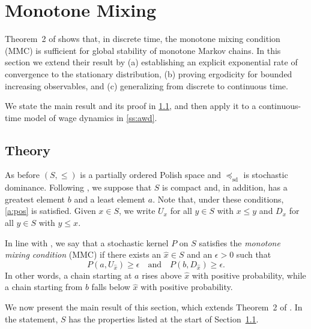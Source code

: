 \documentclass[12pt,reqno]{amsart}
\numberwithin{equation}{section}
\theoremstyle{definition}
\newcommand{\1}{\mathbbm{1}}
\newcommand{\precsd}{\preceq_{\textrm{sd}}}
\newcommand{\navy}[1]{\textit{\textcolor{blue!40!black}{#1}}}
\begin{document}
\section{Monotone Mixing}\label{s:mmc}

Theorem~2 of \cite{hopenhayn1992stochastic} shows that, in discrete time,
the monotone mixing condition (MMC) is sufficient for global stability of
monotone Markov chains. In this section we extend their result by
(a) establishing an explicit exponential rate of convergence to the
stationary distribution, (b) proving ergodicity for bounded increasing
observables, and (c) generalizing from discrete to continuous time.

We state the main result and its proof in \cref{ss:mmctheory}, and then
apply it to a continuous-time model of wage dynamics in \cref{ss:awd}.

\subsection{Theory}\label{ss:mmctheory}

As before $(S, \leq)$ is a partially ordered Polish space and $\precsd$ is
stochastic dominance. Following \cite{hopenhayn1992stochastic}, we suppose that
$S$ is compact and, in addition, has a greatest element $b$ and a least element
$a$. Note that, under these conditions, \cref{a:pos} is satisfied. Given $x \in
S$, we write $U_x$ for all $y \in S$ with $x \leq y$ and $D_x$ for all $y \in S$
with $y \leq x$.

In line with \cite{hopenhayn1992stochastic}, we say that a
stochastic kernel $P$ on $S$ satisfies the \navy{monotone mixing condition}
(MMC) if there exists an $\hat{x} \in S$ and an $\epsilon > 0$ such that
%
\begin{equation}
    P(a, U_{\hat{x}}) \geq \epsilon
    \quad \text{and} \quad
    P(b, D_{\hat{x}}) \geq \epsilon.
\end{equation}
%
In other words, a chain starting at $a$ rises above $\hat{x}$ with positive
probability, while a chain starting from $b$ falls below $\hat{x}$ with positive
probability.

We now present the main result of this section, which extends Theorem~2 of
\cite{hopenhayn1992stochastic}. In the statement,  $S$ has the properties listed at the start of
Section~\ref{ss:mmctheory}.

\vspace{0.4em}
\end{document}
